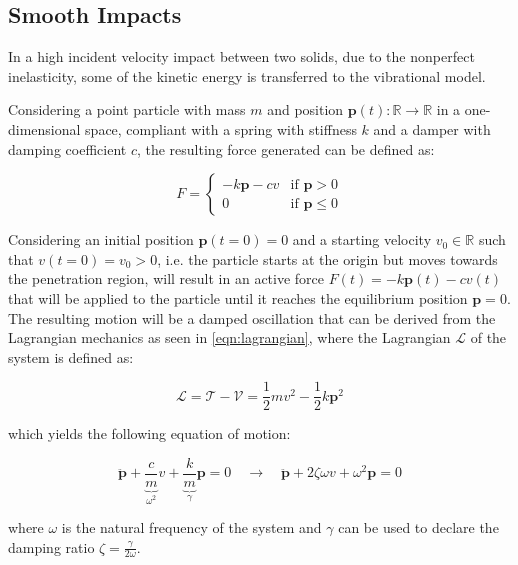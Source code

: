 \subsection{Smooth Impacts}

In a high incident velocity impact between two solids, due to the nonperfect inelasticity, some of the kinetic energy is transferred to the vibrational model.

Considering a point particle with mass $m$ and position $\mathbf{p}(t): \mathbb{R} \rightarrow \mathbb{R}$ in a one-dimensional space, compliant with a spring with stiffness $k$ and a damper with damping coefficient $c$, the resulting force generated can be defined as:

\begin{equation}
    F = \begin{cases}
        -k\mathbf{p} - cv & \text{if } \mathbf{p} > 0    \\
        0                 & \text{if } \mathbf{p} \leq 0
    \end{cases}
\end{equation}

Considering an initial position $\mathbf{p}(t=0) = 0$ and a starting velocity $v_0 \in \mathbb{R}$ such that $v(t=0) = v_0 > 0$, i.e. the particle starts at the origin but moves towards the penetration region, will result in an active force $F(t) = -k\mathbf{p}(t) - cv(t)$ that will be applied to the particle until it reaches the equilibrium position $\mathbf{p} = 0$. The resulting motion will be a damped oscillation that can be derived from the Lagrangian mechanics as seen in \cref{eqn:lagrangian}, where the Lagrangian $\mathcal{L}$ of the system is defined as:

\begin{equation}
    \mathcal{L} = \mathcal{T} - \mathcal{V} = \frac{1}{2}mv^2 - \frac{1}{2}k\mathbf{p}^2
\end{equation}

which yields the following equation of motion:

\begin{equation}
    \ddot{\mathbf{p}} + \underbrace{\frac{c}{m}} _{\omega ^2} v + \underbrace{\frac{k}{m}} _\gamma \mathbf{p} = 0 \quad \rightarrow \quad \ddot{\mathbf{p}} + 2\zeta \omega v + \omega ^2 \mathbf{p} = 0
\end{equation}

where $\omega$ is the natural frequency of the system and $\gamma$ can be used to declare the damping ratio $\zeta = \frac{\gamma}{2\omega}$.

